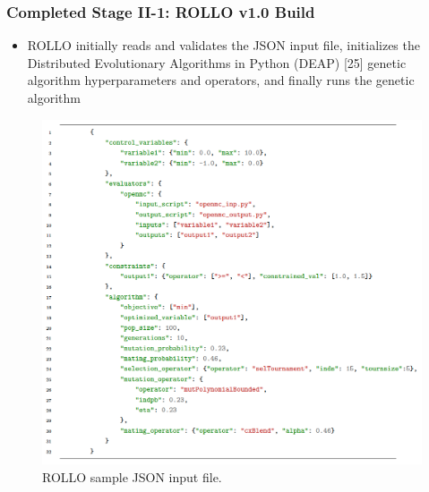 \begin{frame}
    \frametitle{Completed Stage II-1: ROLLO v1.0 Build}
    \begin{itemize}
        \item ROLLO initially reads and validates the JSON input file, initializes 
        the Distributed Evolutionary Algorithms in Python (DEAP) [25] genetic algorithm 
        hyperparameters and operators, and finally runs the genetic algorithm
    \end{itemize}
    \begin{figure}
        \begin{minipage}[c]{0.7\textwidth}
            \centering
        \includegraphics[width=0.7\linewidth]{figures/rollo-json-input.png} 
        \end{minipage}\hfill
        \begin{minipage}[c]{0.3\textwidth}
        \caption{ROLLO sample JSON input file.}
        \end{minipage}
    \end{figure}
\end{frame}